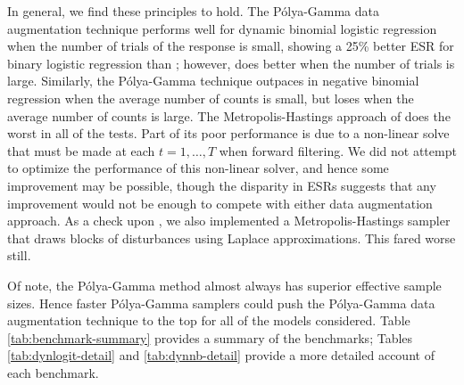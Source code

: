 \documentclass[12pt]{article}
\newcommand{\Polya}{P\'{o}lya}
\begin{document}
In general, we find these principles to hold.  The \Polya-Gamma data
augmentation technique performs well for dynamic binomial logistic regression
when the number of trials of the response is small, showing a 25\% better ESR
for binary logistic regression than \cite{fussl-etal-2013}; however,
\cite{fussl-etal-2013} does better when the number of trials is large.
Similarly, the \Polya-Gamma technique outpaces
\cite{fruhwirth-schnatter-etal-2009} in negative binomial regression when the
average number of counts is small, but loses when the average number of counts
is large.  The Metropolis-Hastings approach of \cite{ravines-etal-2006} does the
worst in all of the tests.  Part of its poor performance is due to a non-linear
solve that must be made at each $t=1, \ldots, T$ when forward filtering.  We did
not attempt to optimize the performance of this non-linear solver, and hence
some improvement may be possible, though the disparity in ESRs suggests that any
improvement would not be enough to compete with either data augmentation
approach.  As a check upon \cite{ravines-etal-2006}, we also implemented a
Metropolis-Hastings sampler that draws blocks of disturbances using Laplace
approximations.  This fared worse still.

Of note, the \Polya-Gamma method almost always has superior effective sample
sizes.  Hence faster \Polya-Gamma samplers could push the \Polya-Gamma data
augmentation technique to the top for all of the models considered.  Table
\ref{tab:benchmark-summary} provides a summary of the benchmarks; Tables
\ref{tab:dynlogit-detail} and \ref{tab:dynnb-detail} provide a more detailed
account of each benchmark.
\end{document}
